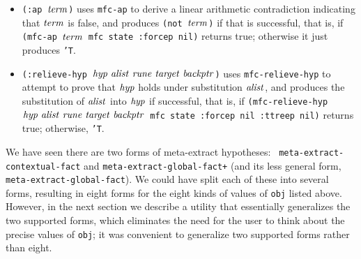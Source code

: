 \begin{itemize}
\item {\tt (:ap $\mathit{term}$)} uses {\tt mfc-ap} to derive a linear
  arithmetic contradiction indicating that $\mathit{term}$ is false, and
  produces {\tt (not $\mathit{term}$)} if that is successful, that is, if
  {\tt (mfc-ap $\mathit{term}$ mfc state :forcep nil)} returns true;
  otherwise it just produces {\tt 'T}.

\item {\tt (:relieve-hyp $\var{hyp}\ \var{alist}\ \var{rune}\
    \var{target}\ \var{backptr}$)} uses {\tt mfc-relieve-hyp} to
  attempt to prove that $\mathit{hyp}$ holds under substitution
  $\mathit{alist}$, and produces the substitution of
  $\mathit{alist}$ into $\mathit{hyp}$ if successful, that is, if
  {\tt (mfc-relieve-hyp $\var{hyp}\ \var{alist}\ \var{rune}\
    \var{target}\ \var{backptr}$ mfc state :forcep nil :ttreep nil)}
  returns true; otherwise, {\tt 'T}.

\end{itemize}


We have seen there are two forms of meta-extract hypotheses: {\tt
  meta-extract-contextual-fact} and {\tt meta-extract-global-fact+}
(and its less general form, {\tt meta-extract-global-fact}).  We could
have split each of these into several forms, resulting in eight forms
for the eight kinds of values of {\tt obj} listed above.  However, in
the next section we describe a utility that essentially generalizes
the two supported forms, which eliminates the need for the user to
think about the precise values of {\tt obj}; it was convenient to
generalize two supported forms rather than eight.

